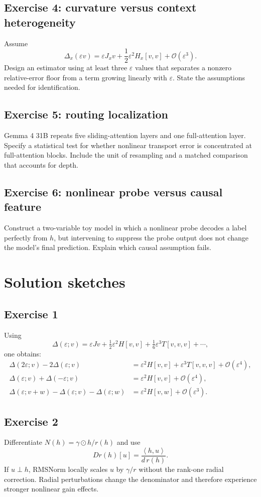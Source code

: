 \documentclass[11pt]{article}
\newcommand{\ip}[2]{\left\langle #1,#2 \right\rangle}
\newcommand{\cO}{\mathcal{O}}
\newcommand{\eps}{\varepsilon}
\theoremstyle{definition}
\theoremstyle{remark}
\begin{document}
\subsection*{Exercise 4: curvature versus context heterogeneity}
Assume
\[
  \Delta_x(\eps v)=\eps J_xv+\frac{1}{2}\eps^2H_x[v,v]+\cO(\eps^3).
\]
Design an estimator using at least three $\eps$ values that separates a nonzero relative-error floor from a term growing linearly with $\eps$. State the assumptions needed for identification.

\subsection*{Exercise 5: routing localization}
Gemma 4 31B repeats five sliding-attention layers and one full-attention layer. Specify a statistical test for whether nonlinear transport error is concentrated at full-attention blocks. Include the unit of resampling and a matched comparison that accounts for depth.

\subsection*{Exercise 6: nonlinear probe versus causal feature}
Construct a two-variable toy model in which a nonlinear probe decodes a label perfectly from $h$, but intervening to suppress the probe output does not change the model's final prediction. Explain which causal assumption fails.

\section{Solution sketches}

\subsection*{Exercise 1}
Using
\[
\Delta(\eps;v)=\eps Jv+\tfrac12\eps^2H[v,v]+\tfrac16\eps^3T[v,v,v]+\cdots,
\]
one obtains:
\begin{align*}
\Delta(2\eps;v)-2\Delta(\eps;v)
  &=\eps^2H[v,v]+\eps^3T[v,v,v]+\cO(\eps^4),\\
\Delta(\eps;v)+\Delta(-\eps;v)
  &=\eps^2H[v,v]+\cO(\eps^4),\\
\Delta(\eps;v+w)-\Delta(\eps;v)-\Delta(\eps;w)
  &=\eps^2H[v,w]+\cO(\eps^3).
\end{align*}

\subsection*{Exercise 2}
Differentiate $N(h)=\gamma\odot h/r(h)$ and use
\[
  Dr(h)[u]=\frac{\ip{h}{u}}{d\,r(h)}.
\]
If $u\perp h$, RMSNorm locally scales $u$ by $\gamma/r$ without the rank-one radial correction. Radial perturbations change the denominator and therefore experience stronger nonlinear gain effects.
\end{document}
